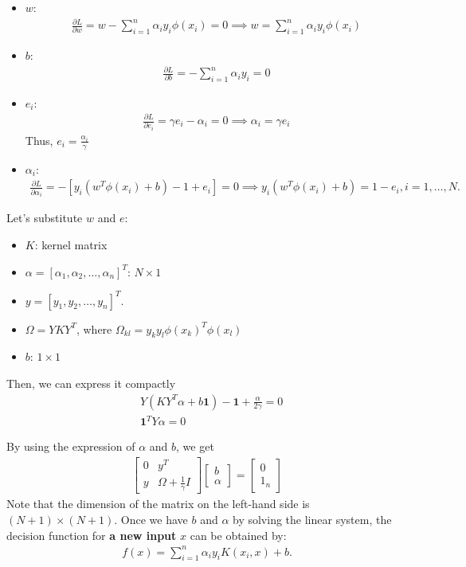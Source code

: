 \begin{itemize}
	\item $w$: 
		\begin{align*}
		   \frac{\partial L}{\partial w} = w - \sum_{i=1}^n \alpha_i y_i \phi(x_i) = 0 \implies w = \sum_{i=1}^n \alpha_i y_i \phi(x_i)
		\end{align*}
	\item $b$:
		\begin{align*}
		   \frac{\partial L}{\partial b} = -\sum_{i=1}^n \alpha_i y_i = 0
		\end{align*}
\item $e_i$:
	\begin{align*}
	   \frac{\partial L}{\partial e_i} = \gamma e_i - \alpha_i = 0 \implies \alpha_i = \gamma e_i
	\end{align*}
	Thus, $e_i = \frac{\alpha_i}{\gamma}$
\item $\alpha_i$:
	\begin{align*}
	   \frac{\partial L}{\partial \alpha_i} = - \left[ y_i (w^T \phi(x_i) + b) - 1 + e_i \right] = 0 \implies y_i (w^T \phi(x_i) + b) = 1 - e_i, i=1,\dots, N.
	\end{align*}
\end{itemize}

Let's substitute $w$ and $e$:
\begin{itemize}
	\item $K$: kernel matrix
	\item $\alpha = [\alpha_1, \alpha_2, \ldots, \alpha_n]^T$: $N\times 1$
	\item $y = [y_1, y_2, \ldots, y_n]^T$.
	\item $\Omega = YKY^T$, where $\Omega_{kl}= y_ky_l\phi(x_k)^T\phi(x_l)$
	\item $b$: $1\times 1$
\end{itemize}

Then, we can express it compactly
\begin{align*}
	&Y(KY^T\alpha+b\mathbf{1})-\mathbf{1}+\frac{\alpha}{2\gamma} = 0\\
	&\mathbf{1}^TY\alpha = 0
\end{align*}

By using the expression of $\alpha$ and $b$, we get
\begin{align*}
	\begin{bmatrix}
	0 & y^T \\
	y & \Omega + \frac{1}{\gamma} I
	\end{bmatrix}
	\begin{bmatrix}
	b \\
	\alpha
	\end{bmatrix}
	=
	\begin{bmatrix}
	0 \\
	1_n
	\end{bmatrix}
\end{align*}
Note that the dimension of the matrix on the left-hand side is $(N+1)\times (N+1)$. Once we have $b$ and $\alpha$ by solving the linear system, the decision function for \textbf{a new input} $x$ can be obtained by:
\begin{align*}
	f(x) = \sum_{i=1}^n \alpha_i y_i K(x_i, x) + b.
\end{align*}
